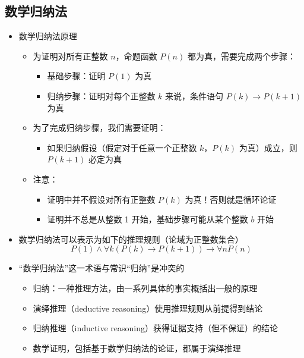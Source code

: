 \documentclass[UTF8]{report}
\theoremstyle{MyLineTheoremStyle} %
\theoremstyle{MyBlockTheoremStyle} %
\theoremstyle{MySubsubsectionStyle} %
\begin{document}
\subsection{数学归纳法}
\begin{itemize}
    \item 数学归纳法原理
    \begin{itemize}
        \item 为证明对所有正整数 $n$，命题函数 $P(n)$ 都为真，需要完成两个步骤：
        \begin{itemize}
            \item 基础步骤：证明 $P(1)$ 为真
            \item 归纳步骤：证明对每个正整数 $k$ 来说，条件语句 $P(k) \rightarrow P(k+1)$ 为真
        \end{itemize}
        \item 为了完成归纳步骤，我们需要证明：
        \begin{itemize}
            \item 如果归纳假设（假定对于任意一个正整数 $k$，$P(k)$ 为真）成立，则 $P(k+1)$ 必定为真
        \end{itemize}
        \item 注意：
        \begin{itemize}
            \item 证明中并不假设对所有正整数 $P(k)$ 为真！否则就是循环论证
            \item 证明并不总是从整数 1 开始，基础步骤可能从某个整数 $b$ 开始
        \end{itemize}
    \end{itemize}
\end{itemize}

\begin{itemize}
    \item 数学归纳法可以表示为如下的推理规则（论域为正整数集合）
    \[
    P(1) \wedge \forall k (P(k) \rightarrow P(k+1)) \rightarrow \forall n P(n)
    \]
    \item “数学归纳法”这一术语与常识“归纳”是冲突的
    \begin{itemize}
        \item 归纳：一种推理方法，由一系列具体的事实概括出一般的原理
        \item 演绎推理（deductive reasoning）使用推理规则从前提得到结论
        \item 归纳推理（inductive reasoning）获得证据支持（但不保证）的结论
        \item 数学证明，包括基于数学归纳法的论证，都属于演绎推理
    \end{itemize}
\end{itemize}
\end{document}
